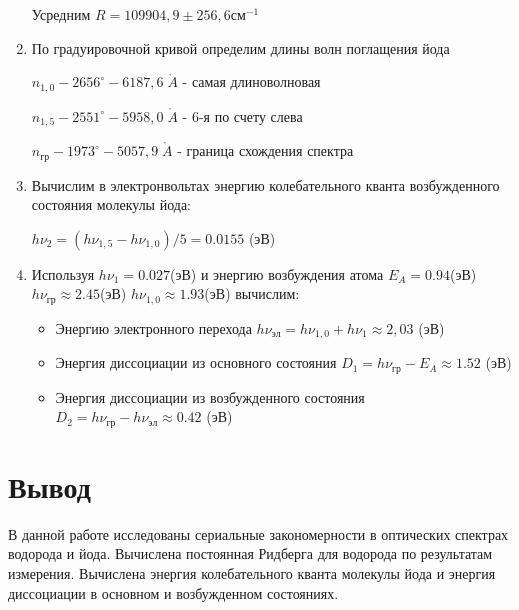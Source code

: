 \documentclass[a4paper]{article}
\begin{document}
\begin{enumerate}
    Усредним $R = 109904,9 \pm 256,6 см^{-1}$

    \item По градуировочной кривой определим длины волн поглащения йода\par
    $n_{1,0} - 2656^{\circ} - 6187,6 \; \mathring{A}$ - самая длиноволновая\par
    $n_{1,5} - 2551^{\circ} - 5958,0\; \mathring{A}$ - 6-я по счету слева\par
    $n_{\text{гр}} - 1973^{\circ} - 5057,9 \; \mathring{A}$ - граница схождения спектра\par
    \item Вычислим в электронвольтах энергию колебательного кванта возбужденного состояния молекулы йода:\par
    $h\nu_2 = (h\nu_{1,5} - h\nu_{1,0})/5 = 0.0155$ (эВ)
    \item Используя $h\nu_1 = 0.027$(эВ) и энергию возбуждения атома $E_A = 0.94$(эВ) $h\nu_{\text{гр}} \approx 2.45$(эВ)  $h\nu_{1,0} \approx 1.93$(эВ) вычислим:
    \begin{itemize}
        \item Энергию электронного перехода $h\nu_{\text{эл}} = h\nu_{1,0} + h\nu_1 \approx 2,03$ (эВ)
        \item Энергия диссоциации из основного состояния $D_1 = h\nu_{\text{гр}} - E_A \approx 1.52$ (эВ)
        \item Энергия диссоциации из возбужденного состояния $D_2 = h\nu_{\text{гр}} - h\nu_{\text{эл}} \approx 0.42$ (эВ)
    \end{itemize}
     
\end{enumerate}

\section{Вывод}
В данной работе исследованы сериальные закономерности в оптических спектрах водорода и йода. 
Вычислена постоянная Ридберга для водорода по результатам измерения. Вычислена энергия колебательного 
кванта молекулы йода и энергия диссоциации в основном и возбужденном состояниях.
\end{document}
